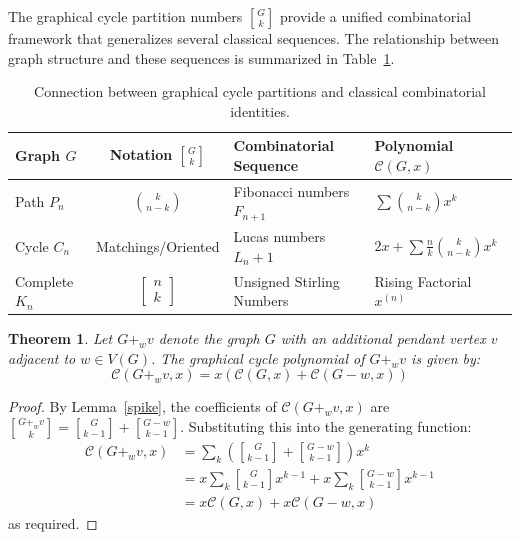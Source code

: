 \documentclass{amsart}
\newtheorem{theorem}{Theorem}[section]
\theoremstyle{definition}
\begin{document}
The graphical cycle partition numbers ${G \brack k}$ provide a unified combinatorial framework that generalizes several classical sequences. The relationship between graph structure and these sequences is summarized in Table~\ref{tab:summary}.

\begin{table}[h]
\centering
\renewcommand{\arraystretch}{1.5}
\begin{tabular}{|l|c|l|l|}
\hline
\textbf{Graph} $G$ & \textbf{Notation} ${G \brack k}$ & \textbf{Combinatorial Sequence} & \textbf{Polynomial} $\mathcal{C}(G, x)$ \\ \hline
Path $P_n$ & $\binom{k}{n-k}$ & Fibonacci numbers $F_{n+1}$ & $\sum \binom{k}{n-k}x^k$ \\ \hline
Cycle $C_n$ & Matchings/Oriented & Lucas numbers $L_n + 1$ & $2x + \sum \frac{n}{k}\binom{k}{n-k}x^k$ \\ \hline
Complete $K_n$ & $\left[ \begin{smallmatrix} n \\ k \end{smallmatrix} \right]$ & Unsigned Stirling Numbers & Rising Factorial $x^{(n)}$ \\ \hline
\end{tabular}
\caption{Connection between graphical cycle partitions and classical combinatorial identities.}
\label{tab:summary}
\end{table}

\begin{theorem}
Let $G+_w v$ denote the graph $G$ with an additional pendant vertex $v$ adjacent to $w \in V(G)$. The graphical cycle polynomial of $G+_w v$ is given by:
\begin{equation*}
    \mathcal{C}(G+_w v, x) = x \left( \mathcal{C}(G, x) + \mathcal{C}(G-w, x) \right)
\end{equation*}
\end{theorem}

\begin{proof}
By Lemma~\ref{spike}, the coefficients of $\mathcal{C}(G+_w v, x)$ are ${G+_w v \brack k} = {G \brack k-1} + {G-w \brack k-1}$. Substituting this into the generating function:
\begin{align*}
    \mathcal{C}(G+_w v, x) &= \sum_{k} \left( {G \brack k-1} + {G-w \brack k-1} \right) x^k \\
    &= x \sum_{k} {G \brack k-1} x^{k-1} + x \sum_{k} {G-w \brack k-1} x^{k-1} \\
    &= x \mathcal{C}(G, x) + x \mathcal{C}(G-w, x)
\end{align*}
as required.
\end{proof}
\end{document}

